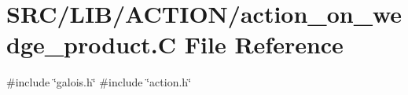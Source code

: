 \hypertarget{action__on__wedge__product_8_c}{}\section{S\+R\+C/\+L\+I\+B/\+A\+C\+T\+I\+O\+N/action\+\_\+on\+\_\+wedge\+\_\+product.C File Reference}
\label{action__on__wedge__product_8_c}
{\ttfamily \#include \char`\"{}galois.\+h\char`\"{}}\newline
{\ttfamily \#include \char`\"{}action.\+h\char`\"{}}\newline
